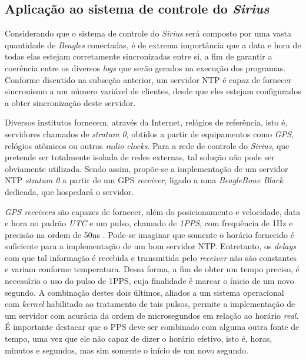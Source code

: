 \FloatBarrier
\subsection {Aplicação ao sistema de controle do \textit{Sirius}}

Considerando que o sistema de controle do \textit{Sirius} será composto por uma
vasta quantidade de \textit{Beagles} conectadas, é de extrema importância que a
data e hora de todas elas estejam corretamente sincronizadas entre si, a fim de
garantir a coerência entre os diversos \textit{logs} que serão gerados na
execução dos programas. Conforme discutido na subseção anterior, um servidor NTP
é capaz de fornecer sincronismo a um número variável de clientes, desde que eles
estejam configurados a obter sincronização deste servidor.

\vspace{12pt}  

Diversos institutos fornecem, através da Internet, relógios de referência, isto
é, servidores chamados de \textit{stratum 0}, obtidos a partir de equipamentos
como \textit{GPS}, relógios atômicos ou outros \textit{radio clocks}. Para a rede
de controle do \textit{Sirius}, que pretende ser totalmente isolada de redes
externas, tal solução não pode ser obviamente utilizada. Sendo assim, propõe-se
a implementação de um servidor NTP \textit{stratum 0} a partir de um GPS
\textit{receiver}, ligado a uma \textit{BeagleBone Black} dedicada, que
hospedará o servidor.

\vspace{12pt}

\textit{GPS receivers} são capazes de fornecer, além do posicionamento e
velocidade, data e hora no padrão \textit{UTC} e um pulso, chamado de
\textit{1PPS}, com frequência de 1Hz e precisão na ordem de 50ns
\cite{gpsdhowto}. Pode-se imaginar que somente o horário fornecido é suficiente
para a implementação de um bom servidor NTP. Entretanto, os \textit{delays} com
que tal informação é recebida e transmitida pelo \textit{receiver} não são
constantes e variam conforme temperatura. Dessa forma, a fim de obter um tempo
preciso, é necessário o uso do pulso de 1PPS, cuja finalidade é marcar o
ínicio de um novo segundo. A combinação destes dois últimos, aliados a um sistema operacional com
\textit{kernel} habilitado ao tratamento de tais pulsos, permite a implementação
de um servidor com acurácia da ordem de microsegundos em relação ao horário
\textit{real}. É importante destacar que o PPS deve ser combinado com alguma
outra fonte de tempo, uma vez que ele não capaz de dizer o horário efetivo, isto
é, horas, minutos e segundos, mas sim somente o início de um novo segundo.

